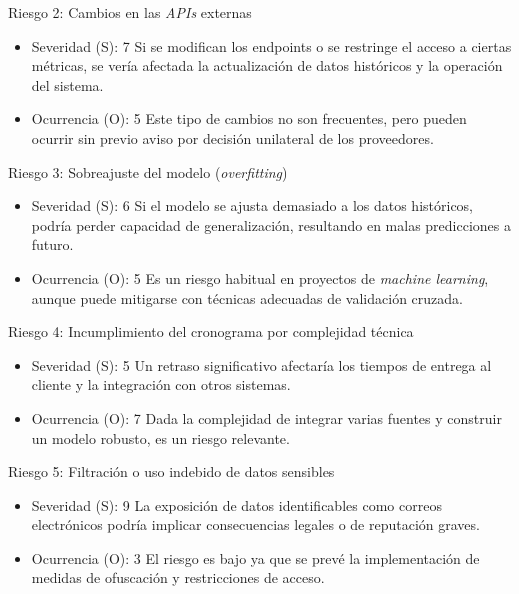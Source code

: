 \documentclass[
11pt, %
]{charter}
\begin{document}
Riesgo 2: Cambios en las \textit{APIs} externas

\begin{itemize}
\item Severidad (S): 7
Si se modifican los endpoints o se restringe el acceso a ciertas métricas, se vería afectada la actualización de datos históricos y la operación del sistema.

\item Ocurrencia (O): 5
Este tipo de cambios no son frecuentes, pero pueden ocurrir sin previo aviso por decisión unilateral de los proveedores.
\end{itemize}

Riesgo 3: Sobreajuste del modelo (\textit{overfitting})

\begin{itemize}
\item Severidad (S): 6
Si el modelo se ajusta demasiado a los datos históricos, podría perder capacidad de generalización, resultando en malas predicciones a futuro.

\item Ocurrencia (O): 5
Es un riesgo habitual en proyectos de \textit{machine learning}, aunque puede mitigarse con técnicas adecuadas de validación cruzada.
\end{itemize}

Riesgo 4: Incumplimiento del cronograma por complejidad técnica

\begin{itemize}
\item Severidad (S): 5
Un retraso significativo afectaría los tiempos de entrega al cliente y la integración con otros sistemas.

\item Ocurrencia (O): 7
Dada la complejidad de integrar varias fuentes y construir un modelo robusto, es un riesgo relevante.
\end{itemize}

Riesgo 5: Filtración o uso indebido de datos sensibles

\begin{itemize}
\item Severidad (S): 9
La exposición de datos identificables como correos electrónicos podría implicar consecuencias legales o de reputación graves.

\item Ocurrencia (O): 3
El riesgo es bajo ya que se prevé la implementación de medidas de ofuscación y restricciones de acceso.
\end{itemize}
\end{document}
